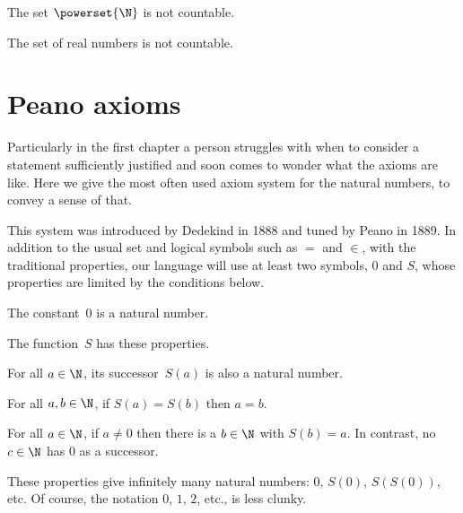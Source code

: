\documentclass{ibl}
\begin{document}
\begin{ex}
\begin{exes}
\item The set $\powerset{\N}$ is not countable.
\item The set of real numbers is not countable.  
\end{exes}
\end{ex}




\appendix
\chapter{Peano axioms}
\newcommand{\axiom}[1]{\textsc{Axiom~#1}\hspace{.5ex}}

Particularly in the 
first chapter a person struggles with when to consider a 
statement sufficiently justified 
and soon comes to wonder what the axioms are like.
Here we give the most often used axiom system for the natural numbers, to
convey a sense of that. 

This system was 
introduced by Dedekind in 1888 and tuned by Peano in 1889.
In addition to the usual set and logical symbols such as $=$ and $\in$,
with the traditional properties, 
our language will use at least two symbols, $0$ and $S$, whose 
properties are limited by the conditions below.

\begin{ax}
The constant~$0$ is a natural number.
\end{ax}

\begin{ax}
The  function~$S$ has these properties.
\begin{exes}
\item {} For all $a\in\N$, its successor~$S(a)$ is also 
  a natural number.
\item {} For all $a,b\in\N$, if $S(a)=S(b)$ then $a=b$.
\item {}
  For all $a\in\N$, if $a\neq 0$ then there is a $b\in\N$ with $S(b)=a$.
  In contrast, no $c\in\N$ has $0$ as a successor.  
\end{exes}
\end{ax}


These properties give infinitely many natural numbers:
$0$, $S(0)$, $S(S(0))$, etc.
Of course, the notation $0$, $1$, $2$, etc., is less clunky.
\end{document}
